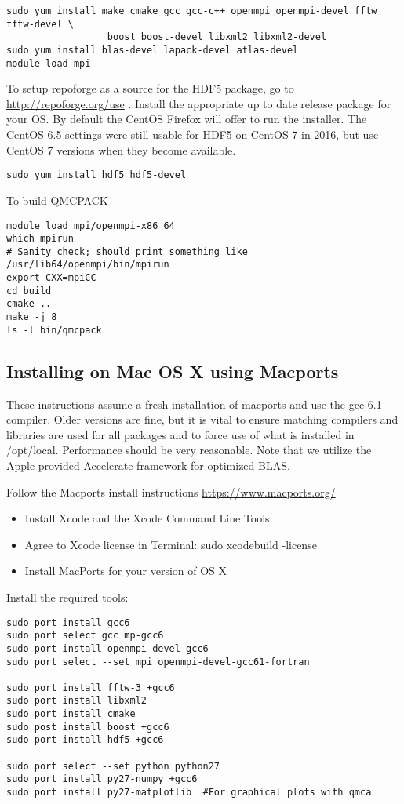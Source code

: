 \begin{verbatim}
sudo yum install make cmake gcc gcc-c++ openmpi openmpi-devel fftw fftw-devel \
                  boost boost-devel libxml2 libxml2-devel
sudo yum install blas-devel lapack-devel atlas-devel
module load mpi 
\end{verbatim}

To setup repoforge as a source for the HDF5 package, go to
\url{http://repoforge.org/use} . Install the appropriate up to date
release package for your OS. By default the CentOS Firefox will offer
to run the installer. The CentOS 6.5 settings were still usable for HDF5 on
CentOS 7 in 2016, but use CentOS 7 versions when they become
available.

\begin{verbatim}
sudo yum install hdf5 hdf5-devel 
\end{verbatim}

To build QMCPACK
\begin{verbatim}
module load mpi/openmpi-x86_64
which mpirun
# Sanity check; should print something like   /usr/lib64/openmpi/bin/mpirun
export CXX=mpiCC
cd build
cmake ..
make -j 8  
ls -l bin/qmcpack
\end{verbatim}

\subsection{Installing on Mac OS X using Macports}
These instructions assume a fresh installation of macports
and use the gcc 6.1 compiler. Older versions are fine, but it is vital to ensure
matching compilers and libraries are used for all
packages and to force use of what is installed in /opt/local.  Performance should be very reasonable.
Note that we utilize the Apple provided Accelerate framework for
optimized BLAS.

Follow the Macports install instructions \url{https://www.macports.org/}

\begin{itemize}
\item Install Xcode and the Xcode Command Line Tools
\item Agree to Xcode license in Terminal: sudo xcodebuild -license
\item Install MacPorts for your version of OS X
\end{itemize}


Install the required tools:

\begin{verbatim} 
sudo port install gcc6
sudo port select gcc mp-gcc6
sudo port install openmpi-devel-gcc6
sudo port select --set mpi openmpi-devel-gcc61-fortran

sudo port install fftw-3 +gcc6
sudo port install libxml2
sudo port install cmake
sudo post install boost +gcc6
sudo port install hdf5 +gcc6

sudo port select --set python python27
sudo port install py27-numpy +gcc6 
sudo port install py27-matplotlib  #For graphical plots with qmca
\end{verbatim}

